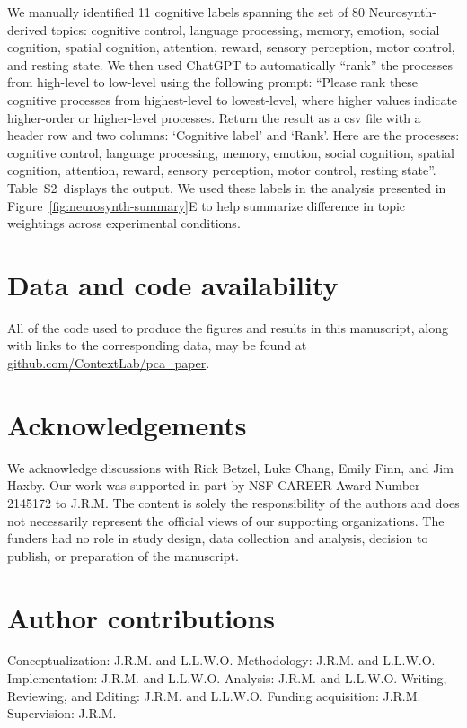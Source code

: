 \documentclass[english, 11pt]{article}
\newcommand{\topicTags}{S2}
\begin{document}
We manually identified 11 cognitive labels
spanning the set of 80 Neurosynth-derived topics: cognitive control, language
processing, memory, emotion, social cognition, spatial cognition, attention,
reward, sensory perception, motor control, and resting state. We then used
ChatGPT to automatically ``rank'' the processes from high-level to low-level
using the following prompt: ``Please rank these cognitive processes from
highest-level to lowest-level, where higher values indicate higher-order or
higher-level processes. Return the result as a csv file with a header row and
two columns: `Cognitive label' and `Rank'. Here are the processes: cognitive
control, language processing, memory, emotion, social cognition, spatial
cognition, attention, reward, sensory perception, motor control, resting
state''.  Table~\topicTags~displays the output.  We used these labels in
the analysis presented in Figure~\ref{fig:neurosynth-summary}E to help summarize
difference in topic weightings across experimental conditions.





\section*{Data and code availability}

All of the code used to produce the figures and results in this manuscript,
along with links to the corresponding data, may be found at
\href{https://github.com/ContextLab/pca_paper}{github.com/ContextLab/pca\_paper}.

\section*{Acknowledgements} 

We acknowledge discussions with Rick Betzel, Luke Chang, Emily Finn, and Jim
Haxby. Our work was supported in part by NSF CAREER Award Number 2145172 to
J.R.M. The content is solely the responsibility of the authors and does not
necessarily represent the official views of our supporting organizations. The
funders had no role in study design, data collection and analysis, decision to
publish, or preparation of the manuscript.


\section*{Author contributions} 

Conceptualization: J.R.M. and L.L.W.O. Methodology: J.R.M. and L.L.W.O.
Implementation: J.R.M. and L.L.W.O. Analysis: J.R.M. and L.L.W.O. Writing,
Reviewing, and Editing: J.R.M. and L.L.W.O. Funding acquisition: J.R.M.
Supervision: J.R.M.



\end{document}
